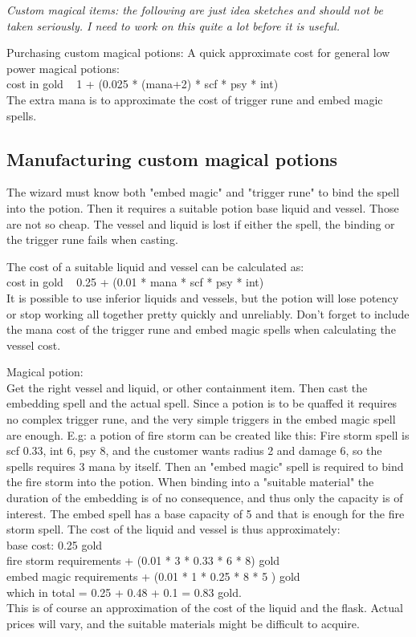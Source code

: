 \emph{Custom magical items: the following are just idea sketches and should not be taken seriously. I need to work on this quite a lot before it is useful.}

Purchasing custom magical potions: A quick approximate cost for general low power magical potions: \\
cost in gold ~ 1 + (0.025 * (mana+2) * scf * psy * int) \\
The extra mana is to approximate the cost of trigger rune and embed magic spells.


\subsection*{Manufacturing custom magical potions}
The wizard must know both "embed magic" and "trigger rune" to bind the spell into the potion. Then it requires a suitable potion base liquid and vessel. Those are not so cheap. The vessel and liquid is lost if either the spell, the binding or the trigger rune fails when casting.

The cost of a suitable liquid and vessel can be calculated as: \\
cost in gold ~ 0.25 + (0.01 * mana * scf * psy * int) \\
It is possible to use inferior liquids and vessels, but the potion will lose potency or stop working all together pretty quickly and unreliably.
Don't forget to include the mana cost of the trigger rune and embed magic spells when calculating the vessel cost.

Magical potion: \\
Get the right vessel and liquid, or other containment item.
Then cast the embedding spell and the actual spell. Since a potion is to be quaffed it requires no complex trigger rune, and the very simple triggers in the embed magic spell are enough.
E.g: a potion of fire storm can be created like this:
Fire storm spell is scf 0.33, int 6, psy 8, and the customer wants radius 2 and damage 6, so the spells requires 3 mana by itself. Then an "embed magic" spell is required to bind the fire storm into the potion. When binding into a "suitable material" the duration of the embedding is of no consequence, and thus only the capacity is of interest. The embed spell has a base capacity of 5 and that is enough for the fire storm spell.
The cost of the liquid and vessel is thus approximately:\\
base cost: 0.25 gold \\
fire storm requirements + (0.01 * 3 * 0.33 * 6 * 8) gold \\
embed magic requirements + (0.01 * 1 * 0.25 * 8 * 5 ) gold \\
which in total = 0.25 + 0.48 + 0.1 = 0.83 gold. \\
This is of course an approximation of the cost of the liquid and the flask. Actual prices will vary, and the suitable materials might be difficult to acquire.

